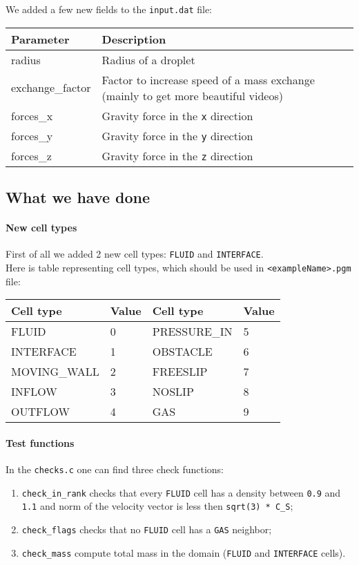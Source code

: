 \documentclass{article}
\providecommand{\tightlist}{%
  \setlength{\itemsep}{0pt}\setlength{\parskip}{0pt}}
\begin{document}
We added a few new fields to the \texttt{input.dat} file:

\begin{longtable}[]{@{}ll@{}}
\toprule
Parameter & Description\tabularnewline
\midrule
\endhead
radius & Radius of a droplet \tabularnewline
exchange\_factor & Factor to increase speed of a mass exchange (mainly to get more beautiful videos) \tabularnewline
forces\_x & Gravity force in the \texttt{x} direction \tabularnewline
forces\_y & Gravity force in the \texttt{y} direction \tabularnewline
forces\_z & Gravity force in the \texttt{z} direction \tabularnewline
\bottomrule
\end{longtable}


\subsection{What we have done}\label{what-we-have-done}

\paragraph{New cell types}\label{new-cell-types}

First of all we added 2 new cell types: \texttt{FLUID} and
\texttt{INTERFACE}.\\
Here is table representing cell types, which should be used in
\texttt{\textless{}exampleName\textgreater{}.pgm} file:

\begin{longtable}[]{@{}llll@{}}
\toprule
Cell type & Value & Cell type & Value\tabularnewline
\midrule
\endhead
FLUID & 0 & PRESSURE\_IN & 5\tabularnewline
INTERFACE & 1 & OBSTACLE & 6\tabularnewline
MOVING\_WALL & 2 & FREESLIP & 7\tabularnewline
INFLOW & 3 & NOSLIP & 8\tabularnewline
OUTFLOW & 4 & GAS & 9\tabularnewline
\bottomrule
\end{longtable}

\paragraph{Test functions}\label{test-functions}

In the \texttt{checks.c} one can find three check functions:

\begin{enumerate}
\tightlist
\item
  \texttt{check\_in\_rank} checks that every \texttt{FLUID} cell has a
  density between \texttt{0.9} and \texttt{1.1} and norm of the velocity
  vector is less then \texttt{sqrt(3)\ *\ C\_S};
\item
  \texttt{check\_flags} checks that no \texttt{FLUID} cell has a
  \texttt{GAS} neighbor;
\item
  \texttt{check\_mass} compute total mass in the domain (\texttt{FLUID}
  and \texttt{INTERFACE} cells).
\end{enumerate}
\end{document}
